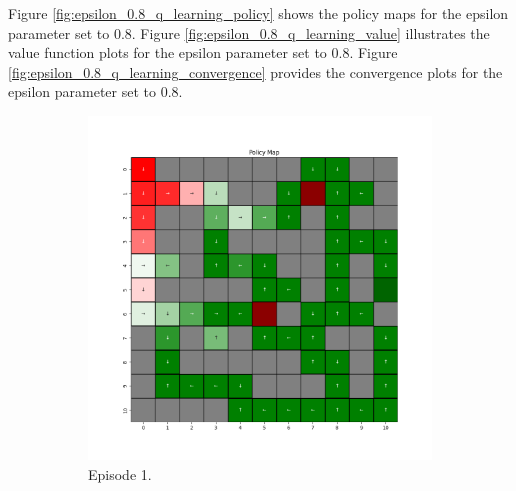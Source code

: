 \documentclass{assignment}
\begin{document}
Figure \ref{fig:epsilon_0.8_q_learning_policy} shows the policy maps for the epsilon parameter set to 0.8. Figure \ref{fig:epsilon_0.8_q_learning_value} illustrates the value function plots for the epsilon parameter set to 0.8. Figure \ref{fig:epsilon_0.8_q_learning_convergence} provides the convergence plots for the epsilon parameter set to 0.8.
\begin{figure}[H]
    \begin{subfigure}{0.3\textwidth}
        \includegraphics[width=\textwidth]{figures/policy_q/epsilon_sweep/policy_alpha_0.1_gamma_0.95_epsilon_0.8_iteration_1.png}
    \caption{Episode 1.}
    \end{subfigure}\hfill
    \begin{subfigure}{0.3\textwidth}

\end{subfigure}
\end{figure}
\end{document}

